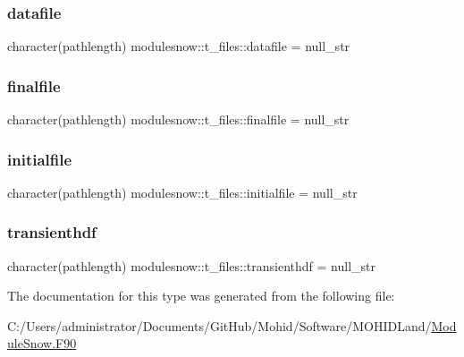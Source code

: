 \subsubsection{\texorpdfstring{datafile}{datafile}}
{\footnotesize\ttfamily character(pathlength) modulesnow\+::t\+\_\+files\+::datafile = null\+\_\+str\hspace{0.3cm}{\ttfamily [private]}}

\mbox{\label{structmodulesnow_1_1t__files_aed6983383ca823af4a5307776c224ddb}} 
\subsubsection{\texorpdfstring{finalfile}{finalfile}}
{\footnotesize\ttfamily character(pathlength) modulesnow\+::t\+\_\+files\+::finalfile = null\+\_\+str\hspace{0.3cm}{\ttfamily [private]}}

\mbox{\label{structmodulesnow_1_1t__files_a9b89cb0c3e15647d8f9f850147deabad}} 
\subsubsection{\texorpdfstring{initialfile}{initialfile}}
{\footnotesize\ttfamily character(pathlength) modulesnow\+::t\+\_\+files\+::initialfile = null\+\_\+str\hspace{0.3cm}{\ttfamily [private]}}

\mbox{\label{structmodulesnow_1_1t__files_a1acadcdefbede3de440cd92b6b2f49e8}} 
\subsubsection{\texorpdfstring{transienthdf}{transienthdf}}
{\footnotesize\ttfamily character(pathlength) modulesnow\+::t\+\_\+files\+::transienthdf = null\+\_\+str\hspace{0.3cm}{\ttfamily [private]}}



The documentation for this type was generated from the following file\+:\begin{DoxyCompactItemize}
\item 
C\+:/\+Users/administrator/\+Documents/\+Git\+Hub/\+Mohid/\+Software/\+M\+O\+H\+I\+D\+Land/\mbox{\hyperlink{_module_snow_8_f90}{Module\+Snow.\+F90}}\end{DoxyCompactItemize}
